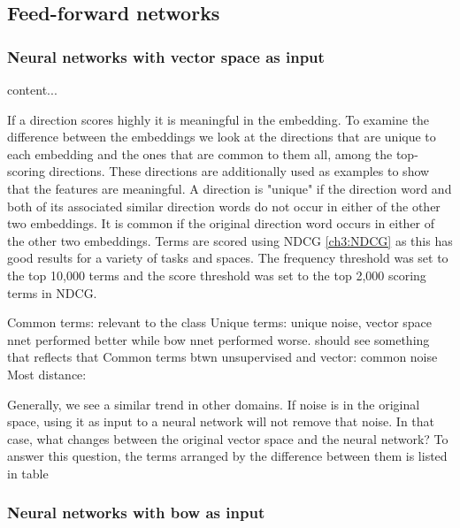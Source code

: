 \subsection{Feed-forward networks}

\subsubsection{Neural networks with vector space as input}


\begin{table}[]\label{Top-scoring unique and common terms}
	content...
\end{table}

 If a direction scores highly it is meaningful in the embedding. To examine the difference between the embeddings we look at the directions that are unique to each embedding and the ones that are common to them all, among the top-scoring directions. These directions are additionally used as examples to show that the features are meaningful. A direction is "unique" if the direction word and both of its associated similar direction words do not occur in either of the other two embeddings. It is common if the original direction word occurs in either of the other two embeddings. Terms are scored using NDCG \ref{ch3:NDCG} as this has good results for a variety of tasks and spaces. The frequency threshold was set to the top 10,000 terms and the score threshold was set to the top 2,000 scoring terms in NDCG. 



Common terms: relevant to the class
Unique terms: unique noise, vector space nnet performed better while bow nnet performed worse. should see something that reflects that
Common terms btwn unsupervised and vector: common noise
Most distance: 

Generally, we see a similar trend in other domains. If noise is in the original space, using it as input to a neural network will not remove that noise. In that case, what changes between the original vector space and the neural network? To answer this question, the terms arranged by the difference between them is listed in table 



\subsubsection{Neural networks with bow as input}



